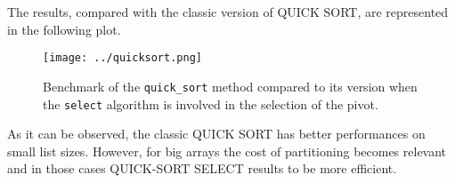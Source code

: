 \documentclass{article}
\begin{document}
	\newpage
	
	\noindent The results, compared with the classic version of QUICK SORT, are represented in the following plot.
	
	\begin{figure}[h]
		\centering
		\texttt{[image: ../quicksort.png]}  
		\caption{Benchmark of the \texttt{quick\_sort} method compared to its version when the \texttt{select} algorithm is involved in the selection of the pivot.}
		\label{plot}
	\end{figure}
	
	\noindent As it can be observed, the classic QUICK SORT has better performances on small list sizes. However, for big arrays the cost of partitioning becomes relevant and in those cases QUICK-SORT SELECT results to be more efficient.
	
\end{document}
